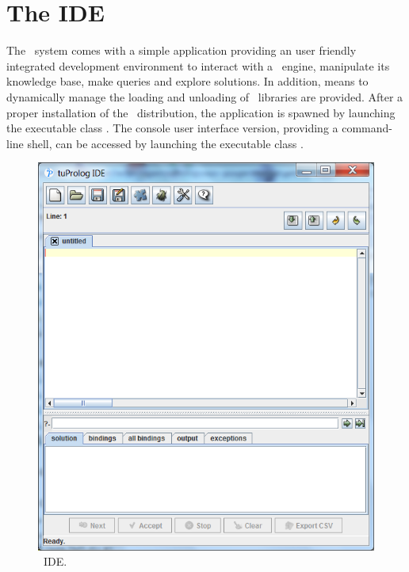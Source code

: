 \section{The IDE}

The \tuprolog\ system comes with a simple application providing an user friendly integrated development environment to interact with a \tuprolog\ engine, manipulate its knowledge base, make queries and explore solutions.
%
In addition, means to dynamically manage the loading and unloading of \tuprolog\ libraries are provided.
%
After a proper installation of the \tuprolog\ distribution, the application is spawned by launching the executable class .
%
The console user interface version, providing a command-line shell, can be accessed by launching the executable class .

\begin{figure}
\centering
\includegraphics[scale=0.60]{images/tuPrologIDE}
\caption{\tuprolog\ IDE.}
\label{tuprolog-ide}
\end{figure}


